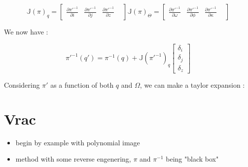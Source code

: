\begin{equation}
      \mathbb{J}(\pi)_q =
\begin{bmatrix}
       \frac{\partial \pi'^{-1}}{\partial i } &
       \frac{\partial \pi'^{-1}}{\partial j } &
       \frac{\partial \pi'^{-1}}{\partial z } &
\end{bmatrix}
      \mathbb{J}(\pi)_\Theta =
\begin{bmatrix}
       \frac{\partial \pi'^{-1}}{\partial \omega } &
       \frac{\partial \pi'^{-1}}{\partial \phi } &
       \frac{\partial \pi'^{-1}}{\partial \kappa } &
\end{bmatrix}
\end{equation}

We now have :

\begin{equation}
        \pi'^{-1}(q')
      =      \pi^{-1}(q) 
          +   \mathbb{J}(\pi'^{-1})_q  \begin{bmatrix} \delta_i \\ \delta_j \\ \delta_z  \end{bmatrix}
\end{equation}

Considering $\pi'$ as a function of both $q$ and $\Omega$,  we can make a taylor expansion :



\section{Vrac}

\begin{itemize}
    \item begin by example with polynomial image
    \item method with some reverse engenering,  $\pi$ and $\pi^{-1}$ being "black box"
\end{itemize}


